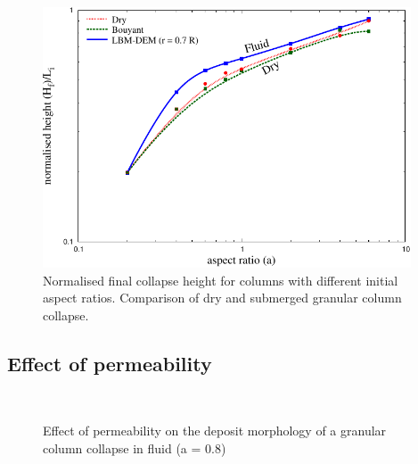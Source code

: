 \begin{figure}[tbhp]
	\centering
	\includegraphics[width=0.975\textwidth]{Heightf}
	\caption{Normalised final collapse height for columns with different 
	initial aspect ratios. Comparison of dry and submerged granular column 
	collapse.}
	\label{fig:heightf}
\end{figure}

\subsection{Effect of permeability}

\begin{figure}
\\
\caption{Effect of permeability on the deposit morphology of a granular column 
collapse in fluid (a = 0.8)}
\label{fig:a08_dense_snapshots}
\end{figure}


